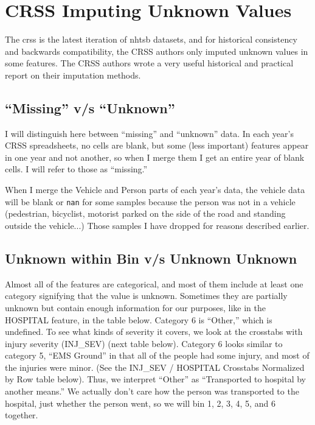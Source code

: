 \section{CRSS Imputing Unknown Values}

The \acrfull{crss} is the latest iteration of \acrfull{nhtsb} datasets, and for historical consistency and backwards compatibility, the CRSS authors only imputed unknown values in some features.  The CRSS authors wrote a very useful historical and practical report on their imputation methods.  \cite{CRSS_Imputation}

\subsection{``Missing'' v/s ``Unknown''}

I will distinguish here between ``missing'' and ``unknown'' data.  In each year's CRSS spreadsheets, no cells are blank, but some (less important) features appear in one year and not another, so when I merge them I get an entire year of blank cells.  I will refer to those as ``missing.''  

When I merge the Vehicle and Person parts of each year's data, the vehicle data will be blank or \verb|nan| for some samples because the person was not in a vehicle (pedestrian, bicyclist, motorist parked on the side of the road and standing outside the vehicle...)  Those samples I have dropped for reasons described earlier.  

\subsection{Unknown within Bin v/s Unknown Unknown}

Almost all of the features are categorical, and most of them include at least one category signifying that the value is unknown.  Sometimes they are partially unknown but contain enough information for our purposes, like in the HOSPITAL feature, in the table below.  Category 6 is ``Other,'' which is undefined.  To see what kinds of severity it covers, we look at the crosstabs with injury severity (INJ\_SEV) (next table below).  Category 6 looks similar to  category 5, ``EMS Ground'' in that all of the people had some injury, and most of the injuries were minor.  (See the INJ\_SEV / HOSPITAL Crosstabs Normalized by Row table below).  Thus, we interpret ``Other'' as ``Transported to hospital by another means.''  We actually don't care how the person was transported to the hospital, just whether the person went, so we will bin 1, 2, 3, 4, 5, and 6 together.  

